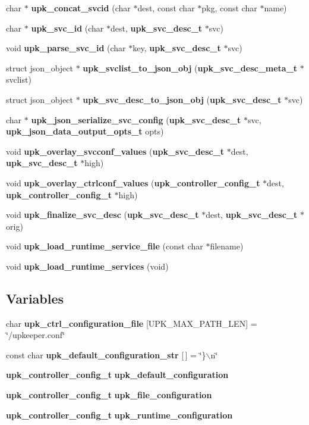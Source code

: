 \begin{DoxyCompactItemize}
\item 
char $\ast$ {\bf upk\_\-concat\_\-svcid} (char $\ast$dest, const char $\ast$pkg, const char $\ast$name)
\item 
char $\ast$ {\bf upk\_\-svc\_\-id} (char $\ast$dest, {\bf upk\_\-svc\_\-desc\_\-t} $\ast$svc)
\item 
void {\bf upk\_\-parse\_\-svc\_\-id} (char $\ast$key, {\bf upk\_\-svc\_\-desc\_\-t} $\ast$svc)
\item 
struct json\_\-object $\ast$ {\bf upk\_\-svclist\_\-to\_\-json\_\-obj} ({\bf upk\_\-svc\_\-desc\_\-meta\_\-t} $\ast$svclist)
\item 
struct json\_\-object $\ast$ {\bf upk\_\-svc\_\-desc\_\-to\_\-json\_\-obj} ({\bf upk\_\-svc\_\-desc\_\-t} $\ast$svc)
\item 
char $\ast$ {\bf upk\_\-json\_\-serialize\_\-svc\_\-config} ({\bf upk\_\-svc\_\-desc\_\-t} $\ast$svc, {\bf upk\_\-json\_\-data\_\-output\_\-opts\_\-t} opts)
\item 
void {\bf upk\_\-overlay\_\-svcconf\_\-values} ({\bf upk\_\-svc\_\-desc\_\-t} $\ast$dest, {\bf upk\_\-svc\_\-desc\_\-t} $\ast$high)
\item 
void {\bf upk\_\-overlay\_\-ctrlconf\_\-values} ({\bf upk\_\-controller\_\-config\_\-t} $\ast$dest, {\bf upk\_\-controller\_\-config\_\-t} $\ast$high)
\item 
void {\bf upk\_\-finalize\_\-svc\_\-desc} ({\bf upk\_\-svc\_\-desc\_\-t} $\ast$dest, {\bf upk\_\-svc\_\-desc\_\-t} $\ast$orig)
\item 
void {\bf upk\_\-load\_\-runtime\_\-service\_\-file} (const char $\ast$filename)
\item 
void {\bf upk\_\-load\_\-runtime\_\-services} (void)
\end{DoxyCompactItemize}
\subsection*{Variables}
\begin{DoxyCompactItemize}
\item 
char {\bf upk\_\-ctrl\_\-configuration\_\-file} [UPK\_\-MAX\_\-PATH\_\-LEN] = \char`\"{}/upkeeper.conf\char`\"{}
\item 
const char {\bf upk\_\-default\_\-configuration\_\-str} [$\,$] = \char`\"{}\}$\backslash$n\char`\"{}
\item 
{\bf upk\_\-controller\_\-config\_\-t} {\bf upk\_\-default\_\-configuration}
\item 
{\bf upk\_\-controller\_\-config\_\-t} {\bf upk\_\-file\_\-configuration}
\item 
{\bf upk\_\-controller\_\-config\_\-t} {\bf upk\_\-runtime\_\-configuration}
\end{DoxyCompactItemize}


